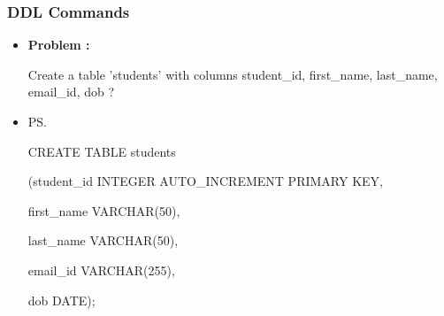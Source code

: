 \begin{frame}
	\frametitle{ DDL Commands}
	
	\begin{itemize}
	
	    \item<1->  \textbf{Problem :}
	    
	     Create a table 'students' with columns student\_id, first\_name, last\_name, email\_id, dob ?
	
	    \item<2->   
	    {\ps
	    	
	    	
	    	 CREATE TABLE students 
	    	
	    	(student\_id INTEGER AUTO\_INCREMENT PRIMARY KEY, 
	    	
	    	first\_name VARCHAR(50), 
	    	
	    	last\_name VARCHAR(50), 
	    	
	    	email\_id VARCHAR(255),  
	    	
	    	dob DATE);
	    	
	    	
	    }
	
	\end{itemize}
	
\end{frame}